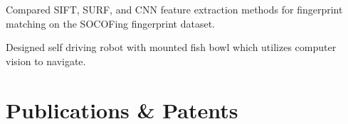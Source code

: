 \documentclass[]{deedy-resume-openfont}
\begin{document}
\begin{minipage}[t]{0.70\textwidth}
\begin{tightemize}
\item Compared SIFT, SURF, and CNN feature extraction methods for fingerprint matching on the SOCOFing fingerprint dataset.
\end{tightemize}
\sectionsep

\begin{tightemize}
\item Designed self driving robot with mounted fish bowl which utilizes computer vision to navigate.

\end{tightemize}
\sectionsep




\section{Publications \& Patents} 


\nocite{*}


\end{minipage}
\end{document}

